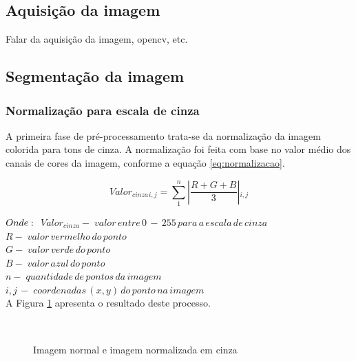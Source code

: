\documentclass[12pt]{article}
\begin{document}
\subsection{Aquisição da imagem}
Falar da aquisição da imagem, opencv, etc.

\subsection{Segmentação da imagem}

\subsubsection{Normalização para escala de cinza}
A primeira fase de pré-processamento trata-se da normalização da imagem colorida para tons de cinza. A normalização foi feita com base no valor médio dos canais de cores da imagem, conforme a equação \ref{eq:normalizacao}.



\begin{equation} \label{eq:normalizacao}
Valor{_{cinza}}{_{i, j}}= \sum_{1}^{n} \left |\frac{R + G + B}{3}\right |{_{i, j}}
\end{equation}

$Onde:\\$
$Valor{_{cinza}} -\; valor\,entre\,0\,-\,255\,para\,a\,escala\,de\,cinza$\\
$R -\; valor\,vermelho\,do\,ponto$\\
$G -\; valor\,verde\,do\,ponto$\\
$B -\; valor\,azul\,do\,ponto$\\
$n -\; quantidade\,de\,pontos\,da\,imagem$\\
$i, j \,-\;coordenadas\, (x,y)\, do\, ponto\, na\, imagem$\\

A Figura \ref{fig2} apresenta o resultado deste processo.

\begin{figure}[ht]
\centering
\mbox{\quad
{}}
\caption{Imagem normal e imagem normalizada em cinza} \label{fig2}
\end{figure}
\end{document}
